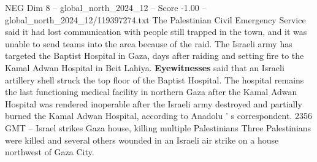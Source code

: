 \begin{textsample}{NEG Dim 8 – global\_north\_2024\_12 – Score -1.00 – global\_north\_2024\_12/119397274.txt}
The Palestinian Civil Emergency Service said it had lost communication with people still trapped in the town, and it was unable to send teams into the area because of the raid.
The Israeli army has targeted the Baptist Hospital in Gaza, days after raiding and setting fire to the Kamal Adwan Hospital in Beit Lahiya. \textbf{Eyewitnesses} said that an Israeli artillery shell struck the top floor of the Baptist Hospital.
The hospital remains the last functioning medical facility in northern Gaza after the Kamal Adwan Hospital was rendered inoperable after the Israeli army destroyed and partially burned the Kamal Adwan Hospital, according to Anadolu ' s correspondent. 2356 GMT -- Israel strikes Gaza house, killing multiple Palestinians Three Palestinians were killed and several others wounded in an Israeli air strike on a house northwest of Gaza City.

\end{textsample}
